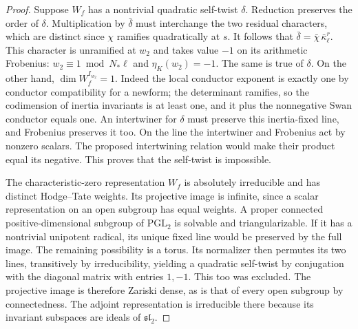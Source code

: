 \documentclass[a4paper,11pt]{article}
\theoremstyle{definition}
\theoremstyle{remark}
\numberwithin{equation}{section}
\begin{document}
\begin{proof}
Suppose \(W_f\) has a nontrivial quadratic self-twist
\(\delta\). Reduction preserves the order of \(\delta\).
Multiplication by \(\bar\delta\) must interchange the two
residual characters, which are distinct since \(\chi\)
ramifies quadratically at \(s\). It follows that
\(\bar\delta=\bar\chi\,\bar\kappa_\ell^r\). This character is
unramified at \(w_2\) and takes value \(-1\) on its arithmetic
Frobenius: \(w_2\equiv1\bmod N_*\ell\) and \(\eta_K(w_2)=-1\).
The same is true of \(\delta\). On the other hand,
\(\dim W_f^{I_{w_2}}=1\). Indeed the local conductor exponent
is exactly one by conductor compatibility for a newform;
the determinant ramifies, so the codimension of inertia
invariants is at least one, and it plus the nonnegative
Swan conductor equals one. An intertwiner for \(\delta\)
must preserve this inertia-fixed line, and Frobenius
preserves it too. On the line the intertwiner and Frobenius
act by nonzero scalars. The proposed intertwining relation
would make their product equal its negative. This proves
that the self-twist is impossible.~\cite{XI-VIII-I-compat123}

The characteristic-zero representation \(W_f\) is absolutely
irreducible and has distinct Hodge--Tate weights. Its
projective image is infinite, since a scalar representation
on an open subgroup has equal weights. A proper connected
positive-dimensional subgroup of \(\mathrm{PGL}_2\) is solvable
and triangularizable. If it has a nontrivial unipotent
radical, its unique fixed line would be preserved by the
full image. The remaining possibility is a torus. Its
normalizer then permutes its two lines, transitively by
irreducibility, yielding a quadratic self-twist by conjugation
with the diagonal matrix with entries \(1,-1\). This too
was excluded. The projective image is therefore Zariski
dense, as is that of every open subgroup by connectedness.
The adjoint representation is irreducible there because its
invariant subspaces are ideals of \(\mathfrak{sl}_2\).


\end{proof}
\end{document}
